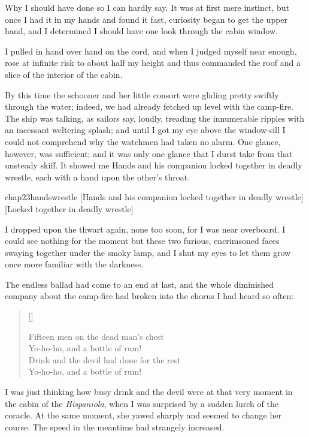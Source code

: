 Why I should have done so I can hardly say. It was at first mere instinct, but once I had it in my hands and found it fast, curiosity began to get the upper hand, and I determined I should have one look through the cabin window.

I pulled in hand over hand on the cord, and when I judged myself near enough, rose at infinite risk to about half my height and thus commanded the roof and a slice of the interior of the cabin.

By this time the schooner and her little consort were gliding pretty swiftly through the water; indeed, we had already fetched up level with the camp-fire. The ship was talking, as sailors say, loudly, treading the innumerable ripples with an incessant weltering splash; and until I got my eye above the window-sill I could not comprehend why the watchmen had taken no alarm. One glance, however, was sufficient; and it was only one glance that I durst take from that unsteady skiff. It showed me Hands and his companion locked together in deadly wrestle, each with a hand upon the other's throat.

\begin{bwbigpic}
	[\basicscale]
	{chap23handswrestle}
	[Hands and his companion locked together in deadly wrestle]
	[Locked together in deadly wrestle]
\end{bwbigpic}

I dropped upon the thwart again, none too soon, for I was near overboard. I could see nothing for the moment but these two furious, encrimsoned faces swaying together under the smoky lamp, and I shut my eyes to let them grow once more familiar with the darkness.

The endless ballad had come to an end at last, and the whole diminished company about the camp-fire had broken into the chorus I had heard so often:

\settowidth{\versewidth}{Drink and the devil had done for the rest\longdash}
\begin{verse}[\versewidth]
\begin{altverse}
Fifteen men on the dead man’s chest\longdash\\
Yo-ho-ho, and a bottle of rum!\\
Drink and the devil had done for the rest\longdash\\
Yo-ho-ho, and a bottle of rum!
\end{altverse}
\end{verse}

I was just thinking how busy drink and the devil were at that very moment in the cabin of the \textit{Hispaniola}, when I was surprised by a sudden lurch of the coracle. At the same moment, she yawed sharply and seemed to change her course. The speed in the meantime had strangely increased.

